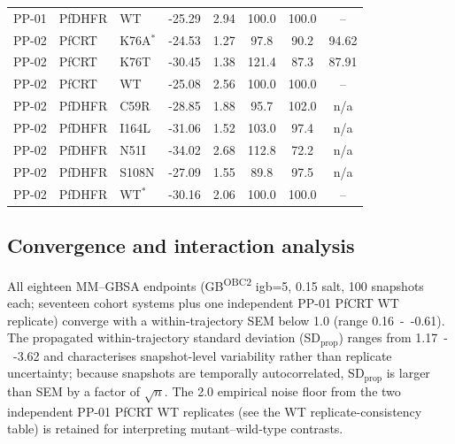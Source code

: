 \documentclass[journal=jcisd8,manuscript=suppinfo,layout=traditional]{achemso}
\begin{document}
\begin{table}[htbp]
\begin{tabularx}{\textwidth}{l l l S[table-format=-2.2] S[table-format=1.2] S[table-format=3.1] S[table-format=3.1] S[table-format=3.2]}
PP-01 & PfDHFR & WT & -25.29 & 2.94 & 100.0 & 100.0 & {--} \\
PP-02 & PfCRT & K76A$^\ast$ & -24.53 & 1.27 & 97.8 & 90.2 & 94.62 \\
PP-02 & PfCRT & K76T & -30.45 & 1.38 & 121.4 & 87.3 & 87.91 \\
PP-02 & PfCRT & WT & -25.08 & 2.56 & 100.0 & 100.0 & {--} \\
PP-02 & PfDHFR & C59R & -28.85 & 1.88 & 95.7 & 102.0 & n/a \\
PP-02 & PfDHFR & I164L & -31.06 & 1.52 & 103.0 & 97.4 & n/a \\
PP-02 & PfDHFR & N51I & -34.02 & 2.68 & 112.8 & 72.2 & n/a \\
PP-02 & PfDHFR & S108N & -27.09 & 1.55 & 89.8 & 97.5 & n/a \\
PP-02 & PfDHFR & WT$^\ast$ & -30.16 & 2.06 & 100.0 & 100.0 & {--} \\
\bottomrule
\end{tabularx}
\setlength{\tabcolsep}{6pt}
\end{table}



\subsection*{Convergence and interaction analysis}
All eighteen MM--GBSA endpoints (GB\textsuperscript{OBC2} igb=5, \qty{0.15}{\molar} salt, \num{100} snapshots each; seventeen cohort systems plus one independent PP-01 PfCRT WT replicate) converge with a within-trajectory SEM below \qty{1.0}{\kcalmol} (range \qty{0.16}{--}\qty{0.61}{\kcalmol}). The propagated within-trajectory standard deviation (SD$_{\mathrm{prop}}$) ranges from \qty{1.17}{--}\qty{3.62}{\kcalmol} and characterises snapshot-level variability rather than replicate uncertainty; because snapshots are temporally autocorrelated, SD$_{\mathrm{prop}}$ is larger than SEM by a factor of $\sqrt{n}$. The \qty{2.0}{\kcalmol} empirical noise floor from the two independent PP-01 PfCRT WT replicates (see the WT replicate-consistency table) is retained for interpreting mutant--wild-type contrasts.
\end{document}

